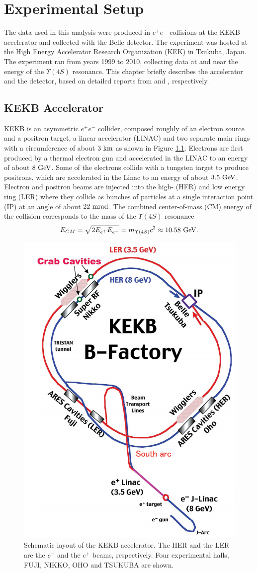 \chapter{Experimental Setup}
The data used in this analysis were produced in $e^+e^-$ collisions at the KEKB accelerator and collected with the Belle detector. The experiment was hosted at the High Energy Accelerator Research Organization (KEK) in Tsukuba, Japan. The experiment ran
from years 1999 to 2010, collecting data at and near the energy of the $\Upsilon(4S)$ resonance. This chapter briefly describes the accelerator and the detector, based on detailed reports from \cite{doi:10.1093/ptep/pts102} and \cite{ABASHIAN2002117}, respectively.


\section{KEKB Accelerator}
KEKB is an asymmetric $e^+e^-$ collider, composed roughly of an electron source and a positron target, a linear accelerator (LINAC) and two separate main rings with a circumference of about $3\mathrm{~km}$ as shown in Figure \ref{fig:kekb}. Electrons are first produced by a thermal electron gun and accelerated in the LINAC to an energy of about $8\mathrm{~GeV}$. Some of the electrons collide with a tungsten target to produce positrons, which are accelerated in the Linac to an energy of about $3.5\mathrm{~GeV}$. Electron and positron beams are injected into the high- (HER) and low energy ring (LER) where they collide as bunches of particles at a single interaction point (IP) at an angle of about $22\mathrm{~mrad}$. The combined center-of-mass (CM) energy of the collision corresponds to the mass of the $\Upsilon(4S)$ resonance
\begin{equation}
E_{CM} = \sqrt{2E_{e^+}E_{e^-}} = m_{\Upsilon(4S)}c^2 \approx 10.58\mathrm{~GeV}.
\end{equation}

\begin{figure}[H]
	\centering
	\captionsetup{width=0.8\linewidth}
	\includegraphics[width=0.5\linewidth]{fig/setup/KEKB}
	\caption{Schematic layout of the KEKB accelerator. The HER and the LER are the $e^-$ and the $e^+$ beams, respectively. Four experimental halls, FUJI, NIKKO, OHO and TSUKUBA are shown.}
	\label{fig:kekb}
\end{figure}

